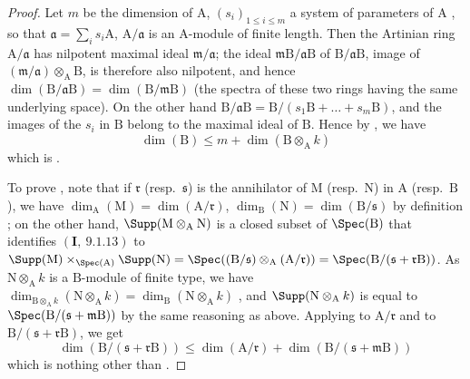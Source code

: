 \begin{proof}
Let $m$ be the dimension of $\mathrm{A}$, $(s_i)_{1\leq i\leq m}$ a system of parameters of $\mathrm{A}$ , so that $\mathfrak{a}=\sum_i s_i\mathrm{A}$, $\mathrm{A}/\mathfrak{a}$ is an $\mathrm{A}$-module of finite length.
Then the Artinian ring $\mathrm{A}/\mathfrak{a}$ has nilpotent maximal ideal $\mathfrak{m}/\mathfrak{a}$; the ideal $\mathfrak{m}\mathrm{B}/\mathfrak{a}\mathrm{B}$ of $\mathrm{B}/\mathfrak{a}\mathrm{B}$, image of $(\mathfrak{m}/\mathfrak{a})\otimes_\mathrm{A}\mathrm{B}$, is therefore also nilpotent, and hence $\dim(\mathrm{B}/\mathfrak{a}\mathrm{B})=\dim(\mathrm{B}/\mathfrak{m}\mathrm{B})$ (the spectra of these two rings having the same underlying space).
On the other hand $\mathrm{B}/\mathfrak{a}\mathrm{B}=\mathrm{B}/(s_1\mathrm{B}+\ldots+s_m\mathrm{B})$, and the images of the $s_i$ in $\mathrm{B}$ belong to the maximal ideal of $\mathrm{B}$.
Hence by , we have
\[
  \dim(\mathrm{B})\leq m+\dim(\mathrm{B}\otimes_\mathrm{A}k)
\]
which is .

To prove , note that if $\mathfrak{r}$ (resp.~$\mathfrak{s}$) is the annihilator of $\mathrm{M}$ (resp.~$\mathrm{N}$) in $\mathrm{A}$ (resp.~$\mathrm{B}$), we have $\dim_\mathrm{A}(\mathrm{M})=\dim(\mathrm{A}/\mathfrak{r})$, $\dim_\mathrm{B}(\mathrm{N})=\dim(\mathrm{B}/\mathfrak{s})$ by definition ; on the other hand, $\Supp(\mathrm{M}\otimes_\mathrm{A}\mathrm{N})$ is a closed subset of $\Spec(\mathrm{B})$ that identifies $(\mathbf{I},~9.1.13)$ to $\Supp(\mathrm{M})\times_{\Spec(\mathrm{A})}\Supp(\mathrm{N})=\Spec((\mathrm{B}/\mathfrak{s})\otimes_\mathrm{A}(\mathrm{A}/\mathfrak{r}))=\Spec(\mathrm{B}/(\mathfrak{s}+\mathfrak{r}\mathrm{B}))$.
As $\mathrm{N}\otimes_\mathrm{A}k$ is a $\mathrm{B}$-module of finite type, we have $\dim_{\mathrm{B}\otimes_\mathrm{A}k}(\mathrm{N}\otimes_\mathrm{A}k)=\dim_\mathrm{B}(\mathrm{N}\otimes_\mathrm{A}k)$ , and $\Supp(\mathrm{N}\otimes_\mathrm{A}k)$ is equal to $\Spec(\mathrm{B}/(\mathfrak{s}+\mathfrak{m}\mathrm{B}))$ by the same reasoning as above.
Applying  to $\mathrm{A}/\mathfrak{r}$ and to $\mathrm{B}/(\mathfrak{s}+\mathfrak{r}\mathrm{B})$, we get
\[
  \dim(\mathrm{B}/(\mathfrak{s}+\mathfrak{r}\mathrm{B}))\leq\dim(\mathrm{A}/\mathfrak{r})+\dim(\mathrm{B}/(\mathfrak{s}+\mathfrak{m}\mathrm{B}))
\]
which is nothing other than .
\end{proof}

